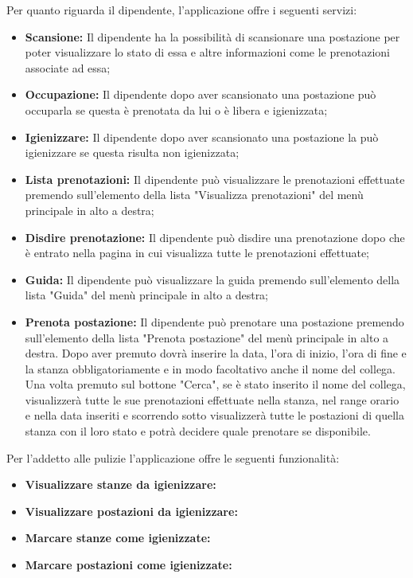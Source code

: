 Per quanto riguarda il dipendente, l'applicazione offre i seguenti servizi:
\begin{itemize}
	\item \textbf{Scansione:} Il dipendente ha la possibilità di scansionare una postazione per poter visualizzare lo stato di essa e altre informazioni come le prenotazioni associate ad essa; \\
	\item \textbf{Occupazione:} Il dipendente dopo aver scansionato una postazione può occuparla se questa è prenotata da lui o è libera e igienizzata; \\
	\item \textbf{Igienizzare:} Il dipendente dopo aver scansionato una postazione la può igienizzare se questa risulta non igienizzata; \\
	\item \textbf{Lista prenotazioni:} Il dipendente può visualizzare le prenotazioni effettuate premendo sull'elemento della lista "Visualizza prenotazioni" del menù principale in alto a destra; \\
	\item \textbf{Disdire prenotazione:} Il dipendente può disdire una prenotazione dopo che è entrato nella pagina in cui visualizza tutte le prenotazioni effettuate; \\
	\item \textbf{Guida:} Il dipendente può visualizzare la guida premendo sull'elemento della lista "Guida" del menù principale in alto a destra; \\
	\item \textbf{Prenota postazione:} Il dipendente può prenotare una postazione premendo sull'elemento della lista "Prenota postazione" del menù principale in alto a destra.
	Dopo aver premuto dovrà inserire la data, l'ora di inizio, l'ora di fine e la stanza obbligatoriamente e in modo facoltativo anche il nome del collega.
	Una volta premuto sul bottone "Cerca", se è stato inserito il nome del collega, visualizzerà tutte le sue prenotazioni effettuate nella stanza, nel range orario e nella data inseriti e scorrendo sotto visualizzerà tutte le postazioni di quella stanza con il loro stato e potrà decidere quale prenotare se disponibile. \\	
\end{itemize}

Per l'addetto alle pulizie l'applicazione offre le seguenti funzionalità:
\begin{itemize}
\item \textbf{Visualizzare stanze da igienizzare:} \\
\item \textbf{Visualizzare postazioni da igienizzare:} \\
\item \textbf{Marcare stanze come igienizzate:} \\
\item \textbf{Marcare postazioni come igienizzate:} \\
\end{itemize}



